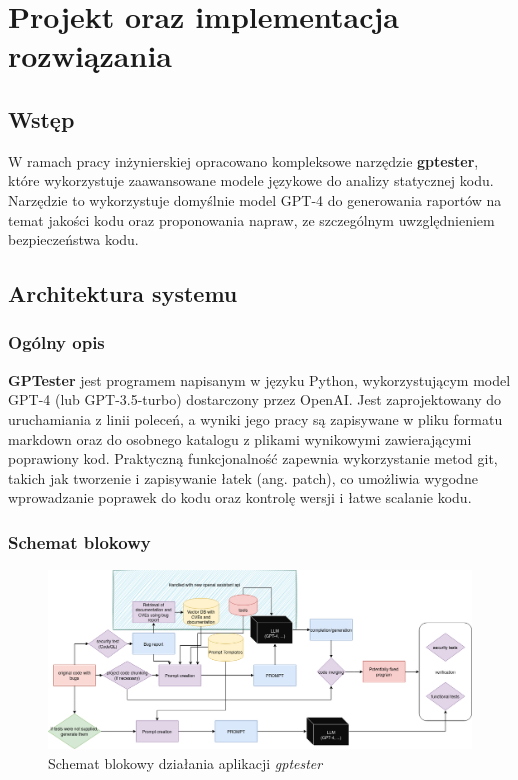 
\chapter{Projekt oraz implementacja rozwiązania}

\section{Wstęp}
W ramach pracy inżynierskiej opracowano kompleksowe narzędzie \textbf{gptester}, które wykorzystuje zaawansowane modele językowe do analizy statycznej kodu.
Narzędzie to wykorzystuje domyślnie model GPT-4 do generowania raportów na temat jakości kodu oraz proponowania napraw, ze szczególnym uwzględnieniem bezpieczeństwa kodu.

\section{Architektura systemu}
\subsection{Ogólny opis}
\textbf{GPTester} jest programem napisanym w języku Python, wykorzystującym model GPT-4 (lub GPT-3.5-turbo) dostarczony przez OpenAI.
Jest zaprojektowany do uruchamiania z linii poleceń, a wyniki jego pracy są zapisywane w pliku formatu markdown oraz do osobnego katalogu z plikami wynikowymi zawierającymi poprawiony kod.
Praktyczną funkcjonalność zapewnia wykorzystanie metod git, takich jak tworzenie i zapisywanie łatek (ang. patch), co umożliwia wygodne wprowadzanie poprawek do kodu oraz kontrolę wersji i łatwe scalanie kodu.

\subsection{Schemat blokowy}
\label{subsec:schemat_blokowy}

\begin{landscape}
\begin{figure}[p]
    \centering
    \includegraphics[width=\linewidth]{img/gptester.drawio.png}
    \caption{Schemat blokowy działania aplikacji \textit{gptester}}
    \label{fig:schemat_blokowy}
\end{figure}
\end{landscape}

